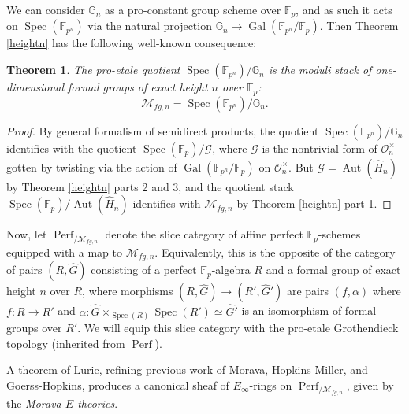 \documentclass[12pt]{article}
\newtheorem{theorem}{Theorem}[section]
\newcommand{\on}{\operatorname}
\begin{document}
We can consider $\mathbb{G}_n$ as a pro-constant group scheme over $\mathbb{F}_p$, and as such it acts on $\on{Spec}(\mathbb{F}_{p^n})$ via the natural projection $\mathbb{G}_n\to \on{Gal}(\mathbb{F}_{p^n}/\mathbb{F}_p)$.  Then Theorem \ref{heightn} has the following well-known consequence:

\begin{theorem}\label{mfgn}
The pro-etale quotient $\on{Spec}(\mathbb{F}_{p^n})/\mathbb{G}_n$ is the moduli stack of one-dimensional formal groups of exact height $n$ over $\mathbb{F}_p$:
$$\mathcal{M}_{fg,n} = \on{Spec}(\mathbb{F}_{p^n})/\mathbb{G}_n.$$
\end{theorem}
\begin{proof}
By general formalism of semidirect products, the quotient $\on{Spec}(\mathbb{F}_{p^n})/\mathbb{G}_n$ identifies with the quotient $\on{Spec}(\mathbb{F}_p)/\mathcal{G}$, where $\mathcal{G}$ is the nontrivial form of $\mathcal{O}_n^\times$ gotten by twisting via the action of $\on{Gal}(\mathbb{F}_{p^n}/\mathbb{F}_p)$ on $\mathcal{O}_n^\times$.  But $\mathcal{G}=\on{Aut}(\widehat{H}_n)$ by Theorem \ref{heightn} parts 2 and 3, and the quotient stack $\on{Spec}(\mathbb{F}_p)/\on{Aut}(\widehat{H}_n)$ identifies with $\mathcal{M}_{fg,n}$ by Theorem \ref{heightn} part 1.
\end{proof}

Now, let $\on{Perf}_{/\mathcal{M}_{fg,n}}$ denote the slice category of affine perfect $\mathbb{F}_p$-schemes equipped with a map to $\mathcal{M}_{fg,n}$.  Equivalently, this is the opposite of the category of pairs $(R,\widehat{G})$ consisting of a perfect $\mathbb{F}_p$-algebra $R$ and a formal group of exact height $n$ over $R$, where morphisms $(R,\widehat{G})\to (R',\widehat{G}')$ are pairs $(f,\alpha)$ where $f:R\to R'$ and $\alpha:\widehat{G}\times_{\on{Spec}(R)}\on{Spec}(R')\simeq \widehat{G}'$ is an isomorphism of formal groups over $R'$.  We will equip this slice category with the pro-etale Grothendieck topology (inherited from $\on{Perf}$).

A theorem of Lurie, refining previous work of Morava, Hopkins-Miller, and Goerss-Hopkins, produces a canonical sheaf of $E_\infty$-rings on $\on{Perf}_{/\mathcal{M}_{fg,n}}$, given by the \emph{Morava $E$-theories}.
\end{document}
